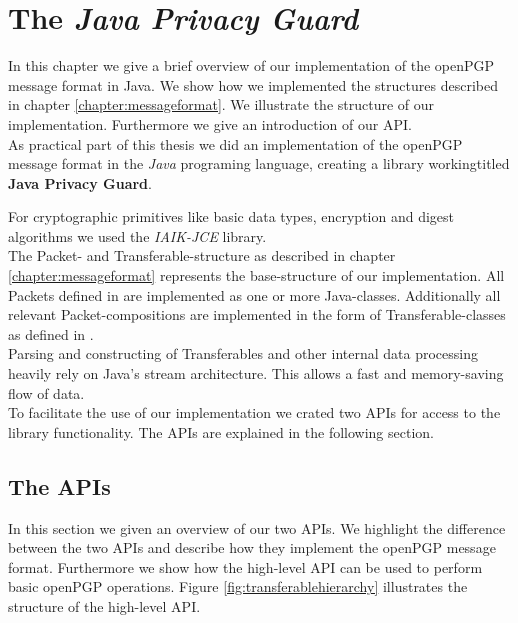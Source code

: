 \chapter{The \textit{Java Privacy Guard}} \label{chapter:jpg}

In this chapter we give a brief overview of our implementation of the openPGP message format in Java. We show how we implemented the structures described in chapter \ref{chapter:messageformat}. We illustrate the structure of our implementation. Furthermore we give an introduction of our API. \\


As practical part of this thesis we did an implementation of the openPGP message format \cite{RFC4880} in the \textit{Java} programing language, creating a library workingtitled \textbf{Java Privacy Guard}.

For cryptographic primitives like basic data types, encryption and digest algorithms we used the \textit{IAIK-JCE} library. \\

The Packet- and Transferable-structure as described in chapter \ref{chapter:messageformat} represents the base-structure of our implementation. All Packets defined in \cite[section 5]{RFC4880} are implemented as one or more Java-classes. Additionally all relevant Packet-compositions are implemented in the form of Transferable-classes as defined in \cite[section 11]{RFC4880}. \\

Parsing and constructing of Transferables and other internal data processing heavily rely on Java's stream architecture. This allows a fast and memory-saving flow of data. \\

To facilitate the use of our implementation we crated two APIs for access to the library functionality. The APIs are explained in the following section.

\section{The APIs}

In this section we given an overview of our two APIs. We highlight the difference between the two APIs and describe how they implement the openPGP message format. Furthermore we show how the high-level API can be used to perform basic openPGP operations. Figure \ref{fig:transferablehierarchy} illustrates the structure of the high-level API. \\

